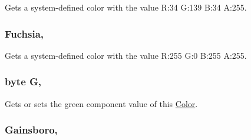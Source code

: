 Gets a system-\/defined color with the value R\+:34 G\+:139 B\+:34 A\+:255.

\hypertarget{structMicrosoft_1_1Xna_1_1Framework_1_1Color_a747de302c829d0e557d262945474d126}{}
\subsubsection[{Fuchsia}]{ Fuchsia\hspace{0.3cm}{\ttfamily [static]}, {\ttfamily [get]}}\label{structMicrosoft_1_1Xna_1_1Framework_1_1Color_a747de302c829d0e557d262945474d126}


Gets a system-\/defined color with the value R\+:255 G\+:0 B\+:255 A\+:255.

\hypertarget{structMicrosoft_1_1Xna_1_1Framework_1_1Color_ad42e5b4daa26324d6319b4b360dd9afb}{}
\subsubsection[{G}]{\setlength{\rightskip}{0pt plus 5cm}byte G\hspace{0.3cm}{\ttfamily [get]}, {\ttfamily [set]}}\label{structMicrosoft_1_1Xna_1_1Framework_1_1Color_ad42e5b4daa26324d6319b4b360dd9afb}


Gets or sets the green component value of this \hyperlink{structMicrosoft_1_1Xna_1_1Framework_1_1Color}{Color}.

\hypertarget{structMicrosoft_1_1Xna_1_1Framework_1_1Color_aea07c873be1d8107ef6186af9a3f92ba}{}
\subsubsection[{Gainsboro}]{ Gainsboro\hspace{0.3cm}{\ttfamily [static]}, {\ttfamily [get]}}\label{structMicrosoft_1_1Xna_1_1Framework_1_1Color_aea07c873be1d8107ef6186af9a3f92ba}


